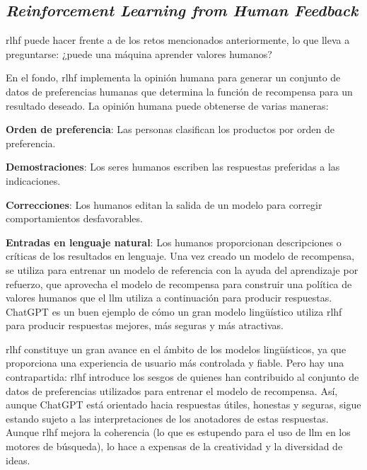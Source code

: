 \subsection{\textit{Reinforcement Learning from Human Feedback}}

\acrfull{rlhf} puede hacer frente a de los retos mencionados anteriormente, lo que  lleva a preguntarse: ¿puede una máquina aprender valores humanos?

En el fondo, \acrshort{rlhf} implementa la opinión humana para generar un conjunto de datos de preferencias humanas que determina la función de recompensa para un resultado deseado. La opinión humana puede obtenerse de varias maneras\cite{Tolaka}:

\begin{description}    

\item \textbf{Orden de preferencia}: Las personas clasifican los productos por orden de preferencia.

\item \textbf{Demostraciones}: Los seres humanos escriben las respuestas preferidas a las indicaciones.

\item \textbf{Correcciones}: Los humanos editan la salida de un modelo para corregir comportamientos desfavorables.

\item \textbf{Entradas en lenguaje natural}: Los humanos proporcionan descripciones o críticas de los resultados en lenguaje. Una vez creado un modelo de recompensa, se utiliza para entrenar un modelo de referencia con la ayuda del aprendizaje por refuerzo, que aprovecha el modelo de recompensa para construir una política de valores humanos que el \acrlong{llm} utiliza a continuación para producir respuestas. ChatGPT es un buen ejemplo de cómo un gran modelo lingüístico utiliza \acrshort{rlhf} para producir respuestas mejores, más seguras y más atractivas.

\end{description}

\acrshort{rlhf} constituye un gran avance en el ámbito de los modelos lingüísticos, ya que proporciona una experiencia de usuario más controlada y fiable. Pero hay una contrapartida: \acrshort{rlhf} introduce los sesgos de quienes han contribuido al conjunto de datos de preferencias utilizados para entrenar el modelo de recompensa. Así, aunque ChatGPT está orientado hacia respuestas útiles, honestas y seguras, sigue estando sujeto a las interpretaciones de los anotadores de estas respuestas. Aunque \acrshort{rlhf} mejora la coherencia (lo que es estupendo para el uso de \acrshort{llm} en los motores de búsqueda), lo hace a expensas de la creatividad y la diversidad de ideas.

